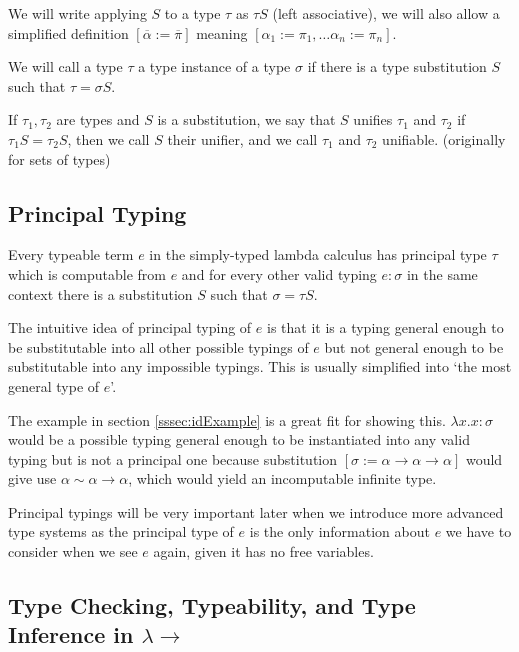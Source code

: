 We will write applying $S$ to a type $\tau$ as $\tau S$ (left associative), we will also allow a simplified definition $[\overline{\alpha} := \overline{\pi}]$ meaning $[\alpha_1 := \pi_1, \dots \alpha_n := \pi_n]$.

\begin{defn}
    \label{defn:typeInstance}
    We will call a type $\tau$ a type instance of a type $\sigma$ if there is a type substitution $S$ such that $\tau = \sigma S$.
\end{defn}

\begin{defn}
    \label{defn:unifier}
    If $\tau_1, \tau_2$ are types and $S$ is a substitution, we say that $S$ unifies $\tau_1$ and $\tau_2$ if $\tau_1 S = \tau_2 S$, then we call $S$ their unifier, and we call $\tau_1$ and $\tau_2$ unifiable. \cite{robinson1965machine} (originally for sets of types)
\end{defn}

\subsection{Principal Typing}

Every typeable term $e$ in the simply-typed lambda calculus has principal type $\tau$ \cite{barendregt1992lambda} which is computable from $e$ and for every other valid typing $e : \sigma$ in the same context there is a substitution $S$ such that $\sigma = \tau S$.

The intuitive idea of principal typing of $e$ is that it is a typing general enough to be substitutable into all other possible typings of $e$ but not general enough to be substitutable into any impossible typings. This is usually simplified into `the most general type of $e$'.

The example in section \ref{sssec:idExample} is a great fit for showing this. $\lambda x . x : \sigma$ would be a possible typing general enough to be instantiated into any valid typing but is not a principal one because substitution $[\sigma := \alpha \rightarrow \alpha \rightarrow \alpha]$ would give use $\alpha \sim \alpha \rightarrow \alpha$, which would yield an incomputable infinite type.

Principal typings will be very important later when we introduce more advanced type systems as the principal type of $e$ is the only information about $e$ we have to consider when we see $e$ again, given it has no free variables.

\subsection{Type Checking, Typeability, and Type Inference in $\lambda\rightarrow$}

